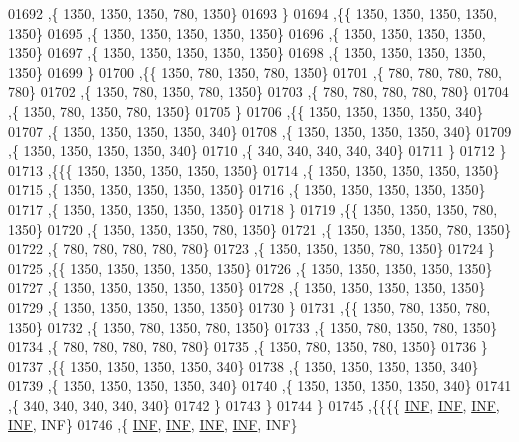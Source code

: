 \begin{DoxyCode}
01692    ,\{  1350,  1350,  1350,   780,  1350\}
01693    \}
01694   ,\{\{  1350,  1350,  1350,  1350,  1350\}
01695    ,\{  1350,  1350,  1350,  1350,  1350\}
01696    ,\{  1350,  1350,  1350,  1350,  1350\}
01697    ,\{  1350,  1350,  1350,  1350,  1350\}
01698    ,\{  1350,  1350,  1350,  1350,  1350\}
01699    \}
01700   ,\{\{  1350,   780,  1350,   780,  1350\}
01701    ,\{   780,   780,   780,   780,   780\}
01702    ,\{  1350,   780,  1350,   780,  1350\}
01703    ,\{   780,   780,   780,   780,   780\}
01704    ,\{  1350,   780,  1350,   780,  1350\}
01705    \}
01706   ,\{\{  1350,  1350,  1350,  1350,   340\}
01707    ,\{  1350,  1350,  1350,  1350,   340\}
01708    ,\{  1350,  1350,  1350,  1350,   340\}
01709    ,\{  1350,  1350,  1350,  1350,   340\}
01710    ,\{   340,   340,   340,   340,   340\}
01711    \}
01712   \}
01713  ,\{\{\{  1350,  1350,  1350,  1350,  1350\}
01714    ,\{  1350,  1350,  1350,  1350,  1350\}
01715    ,\{  1350,  1350,  1350,  1350,  1350\}
01716    ,\{  1350,  1350,  1350,  1350,  1350\}
01717    ,\{  1350,  1350,  1350,  1350,  1350\}
01718    \}
01719   ,\{\{  1350,  1350,  1350,   780,  1350\}
01720    ,\{  1350,  1350,  1350,   780,  1350\}
01721    ,\{  1350,  1350,  1350,   780,  1350\}
01722    ,\{   780,   780,   780,   780,   780\}
01723    ,\{  1350,  1350,  1350,   780,  1350\}
01724    \}
01725   ,\{\{  1350,  1350,  1350,  1350,  1350\}
01726    ,\{  1350,  1350,  1350,  1350,  1350\}
01727    ,\{  1350,  1350,  1350,  1350,  1350\}
01728    ,\{  1350,  1350,  1350,  1350,  1350\}
01729    ,\{  1350,  1350,  1350,  1350,  1350\}
01730    \}
01731   ,\{\{  1350,   780,  1350,   780,  1350\}
01732    ,\{  1350,   780,  1350,   780,  1350\}
01733    ,\{  1350,   780,  1350,   780,  1350\}
01734    ,\{   780,   780,   780,   780,   780\}
01735    ,\{  1350,   780,  1350,   780,  1350\}
01736    \}
01737   ,\{\{  1350,  1350,  1350,  1350,   340\}
01738    ,\{  1350,  1350,  1350,  1350,   340\}
01739    ,\{  1350,  1350,  1350,  1350,   340\}
01740    ,\{  1350,  1350,  1350,  1350,   340\}
01741    ,\{   340,   340,   340,   340,   340\}
01742    \}
01743   \}
01744  \}
01745 ,\{\{\{\{   \hyperlink{constants_8h_a12c2040f25d8e3a7b9e1c2024c618cb6}{INF},   \hyperlink{constants_8h_a12c2040f25d8e3a7b9e1c2024c618cb6}{INF},   \hyperlink{constants_8h_a12c2040f25d8e3a7b9e1c2024c618cb6}{INF},   \hyperlink{constants_8h_a12c2040f25d8e3a7b9e1c2024c618cb6}{INF},   INF\}
01746    ,\{   \hyperlink{constants_8h_a12c2040f25d8e3a7b9e1c2024c618cb6}{INF},   \hyperlink{constants_8h_a12c2040f25d8e3a7b9e1c2024c618cb6}{INF},   \hyperlink{constants_8h_a12c2040f25d8e3a7b9e1c2024c618cb6}{INF},   \hyperlink{constants_8h_a12c2040f25d8e3a7b9e1c2024c618cb6}{INF},   INF\}

\end{DoxyCode}
